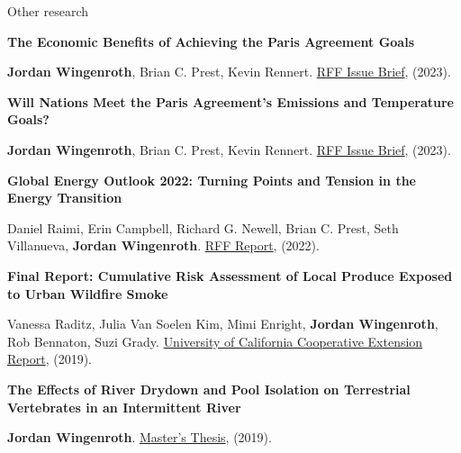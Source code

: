 \documentclass{resume} %
\begin{document}
\begin{rSection}{Other research}

{\bf The Economic Benefits of Achieving the Paris Agreement Goals}
\vspace{-7pt}
\begin{adjustwidth}{12pt}{}
{\small \textbf{Jordan Wingenroth}, Brian C. Prest, Kevin Rennert. \href{https://www.rff.org/publications/issue-briefs/the-economic-benefits-of-achieving-the-paris-agreement-goals/}{RFF Issue Brief}, (2023).}
\end{adjustwidth}

{\bf Will Nations Meet the Paris Agreement's Emissions and Temperature Goals?}
\vspace{-7pt}
\begin{adjustwidth}{12pt}{}
{\small \textbf{Jordan Wingenroth}, Brian C. Prest, Kevin Rennert. \href{https://www.rff.org/publications/issue-briefs/will-nations-meet-the-paris-agreements-emissions-and-temperature-goals/}{RFF Issue Brief}, (2023).}
\end{adjustwidth}

{\bf Global Energy Outlook 2022: Turning Points and Tension in the Energy Transition}
\vspace{-7pt}
\begin{adjustwidth}{12pt}{}
{\small Daniel Raimi, Erin Campbell, Richard G. Newell, Brian C. Prest, Seth Villanueva, \textbf{Jordan Wingenroth}. \href{https://www.rff.org/publications/reports/global-energy-outlook-2022/}{RFF Report}, (2022).}
\end{adjustwidth}

\pagebreak

{\bf Final Report: Cumulative Risk Assessment of Local Produce Exposed to Urban Wildfire Smoke}
\vspace{-7pt}
\begin{adjustwidth}{12pt}{}
{\small Vanessa Raditz, Julia Van Soelen Kim, Mimi Enright, \textbf{Jordan Wingenroth}, Rob Bennaton, Suzi Grady. \href{https://ucanr.edu/sites/SoCo/files/308873.pdf}{University of California Cooperative Extension Report}, (2019).}
\end{adjustwidth}

{\bf The Effects of River Drydown and Pool Isolation on Terrestrial Vertebrates in an Intermittent River}
\vspace{-7pt}
\begin{adjustwidth}{12pt}{}
{\small \textbf{Jordan Wingenroth}. \href{https://digicoll.lib.berkeley.edu/record/140194?ln=en}{Master's Thesis}, (2019).}
\end{adjustwidth}

\end{rSection}
\end{document}
